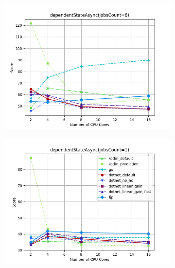 \documentclass{article}
\begin{document}
\begin{figure}[H]
    \begin{subfigure}[b]{0.48\textwidth}
        \includegraphics[width=\linewidth]{plots/dependentStateAsync(jobsCount=8).png}
    \end{subfigure}
    \begin{subfigure}[b]{0.48\textwidth}
        \includegraphics[width=\linewidth]{plots/dependentStateAsync(jobsCount=1)_with_legend.png}
    \end{subfigure}
\end{figure}
\end{document}
